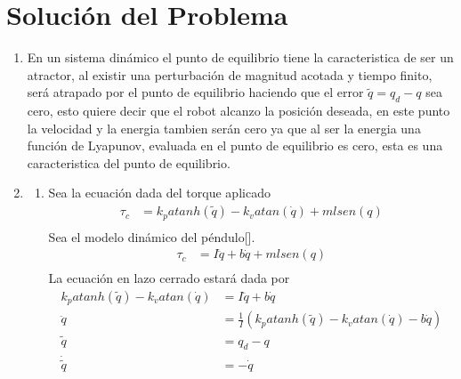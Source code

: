 \documentclass[12pt]{article}
\begin{document}
\section{Solución del Problema}
\begin{enumerate}
    \item En un sistema dinámico el punto de equilibrio tiene la caracteristica de ser un atractor, al existir una perturbación de magnitud acotada y tiempo finito, será atrapado por el punto de equilibrio haciendo que el error $\tilde{q}=q_d-q$ sea cero, esto quiere decir que el robot alcanzo la posición deseada, en este punto la velocidad y la energia tambien serán cero ya que al ser la energia una función de Lyapunov, evaluada en el punto de equilibrio es cero, esta es una caracteristica del punto de equilibrio.
    \item 
    \begin{enumerate}
        \item Sea la ecuación dada del torque aplicado
        \begin{equation}
            \begin{split}
                \tau_c&=k_p atanh(\tilde{q})-k_v atan(\dot{q})+mlsen(q)\\
            \end{split}
            \label{eq:torq}
        \end{equation}
        Sea el modelo dinámico del péndulo[\cite{reyes2011robotica}].
        \begin{equation}
            \begin{split}
                \tau_c&=I\ddot{q}+b\dot{q}+mlsen(q)\\
            \end{split}
            \label{eq:pendulo}
        \end{equation}
        La ecuación en lazo cerrado estará dada por 
        \begin{equation}
            \begin{split}
                k_p atanh(\tilde{q})-k_v atan(\dot{q})&=I\ddot{q}+b\dot{q}\\
                \ddot{q}&=\frac{1}{I}(k_p atanh(\tilde{q})-k_v atan(\dot{q})-b\dot{q})\\
                \tilde{q}&=q_d-q\\
                \dot{\tilde{q}}&=-\dot{q}\\
            \end{split}
            \label{eq:close_loop}

\end{equation}
\end{enumerate}
\end{enumerate}
\end{document}
